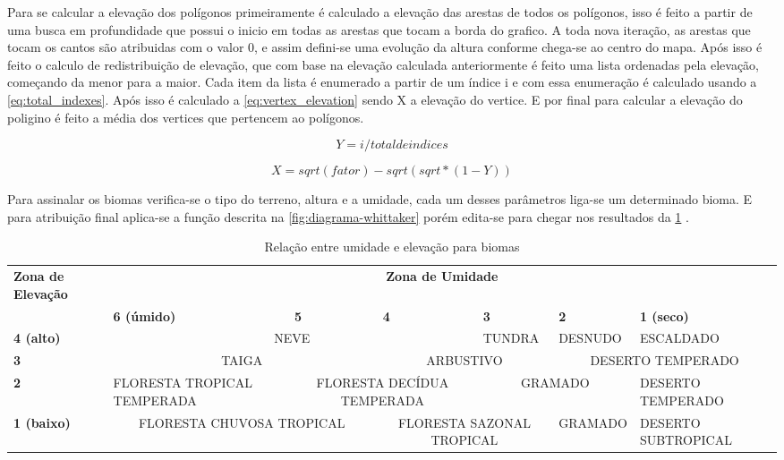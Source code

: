 Para se calcular a elevação dos polígonos primeiramente é calculado a elevação das arestas de todos os polígonos, isso é feito a partir de uma busca em profundidade que possui o inicio em todas as arestas que tocam a borda do grafico. A toda nova iteração, as arestas que tocam os cantos são atribuidas com o valor 0, e assim defini-se uma evolução da altura conforme chega-se ao centro do mapa.
Após isso é feito o calculo de redistribuição de elevação, que com base na elevação calculada anteriormente é feito uma lista ordenadas pela elevação, começando da menor para a maior. Cada item da lista é enumerado a partir de um índice i e com essa enumeração é calculado usando a \cref{eq:total_indexes}. Após isso é calculado a \cref{eq:vertex_elevation} sendo X a elevação do vertice.
E por final para calcular a elevação do poligino é feito a média dos vertices que pertencem ao polígonos.

\begin{equation}
	\label{eq:total_indexes}
	Y = i / total de indices
\end{equation}

\begin{equation}
	\label{eq:vertex_elevation}
	X = sqrt(fator) - sqrt(sqrt * (1 - Y))
\end{equation}

Para assinalar os biomas verifica-se o tipo do terreno, altura e a umidade, cada um desses parâmetros liga-se um determinado bioma. E para atribuição final aplica-se a função descrita na \cref{fig:diagrama-whittaker} porém edita-se para chegar nos resultados da \cref{tab:biomes} \space\cite{amitp2010}.

\begin{table}
	\centering
	\caption{Relação entre umidade e elevação para biomas}
	\label{tab:biomes}
	\begin{tabularx}{\textwidth}{|X|X|X|X|X|X|X|}
	\hline
	\textbf{Zona de Elevação} & \multicolumn{6}{c|}{\textbf{Zona de Umidade}} \\
	\cline{2-7}
	 & \textbf{6 (úmido)} & \textbf{5} & \textbf{4} & \textbf{3} & \textbf{2} & \textbf{1 (seco)} \\
	\hline
	\textbf{4 (alto)} & \multicolumn{3}{|c|}{NEVE} & TUNDRA & DESNUDO & ESCALDADO  \\
	\hline
	\textbf{3} & \multicolumn{2}{|c|}{TAIGA} & \multicolumn{2}{|c|}{ARBUSTIVO} & \multicolumn{2}{|c|}{DESERTO TEMPERADO} \\
	\hline
	\textbf{2} & FLORESTA TROPICAL TEMPERADA & \multicolumn{2}{|c|}{FLORESTA DECÍDUA TEMPERADA} & \multicolumn{2}{|c|}{GRAMADO} & DESERTO TEMPERADO  \\
	\hline
	\textbf{1 (baixo)} &  \multicolumn{2}{|c|}{FLORESTA CHUVOSA TROPICAL} & \multicolumn{2}{|c|}{FLORESTA SAZONAL TROPICAL} & GRAMADO & DESERTO SUBTROPICAL  \\
	\hline
	\end{tabularx}
\end{table}

